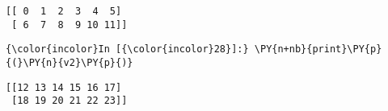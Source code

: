     \begin{Verbatim}[commandchars=\\\{\}]
[[ 0  1  2  3  4  5]
 [ 6  7  8  9 10 11]]

    \end{Verbatim}

    \begin{Verbatim}[commandchars=\\\{\}]
{\color{incolor}In [{\color{incolor}28}]:} \PY{n+nb}{print}\PY{p}{(}\PY{n}{v2}\PY{p}{)}
\end{Verbatim}


    \begin{Verbatim}[commandchars=\\\{\}]
[[12 13 14 15 16 17]
 [18 19 20 21 22 23]]

    \end{Verbatim}


    
    
    

